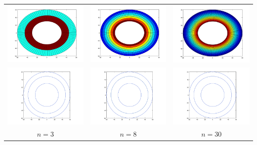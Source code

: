     {\centering \begin{tabular}{ccc}
      \includegraphics[width=4.5cm]{graficos/1/1b-3.png} &
      \includegraphics[width=4.5cm]{graficos/1/1b-8.png} &
      \includegraphics[width=4.5cm]{graficos/1/1b-30.png} \\
      \includegraphics[width=4.5cm]{graficos/1/1b-3-iso.png} &
      \includegraphics[width=4.5cm]{graficos/1/1b-8-iso.png} &
      \includegraphics[width=4.5cm]{graficos/1/1b-30-iso.png} \\
      {\small $n = 3$} &
      {\small $n = 8$} &
      {\small $n = 30$} \\
    \end{tabular}}

